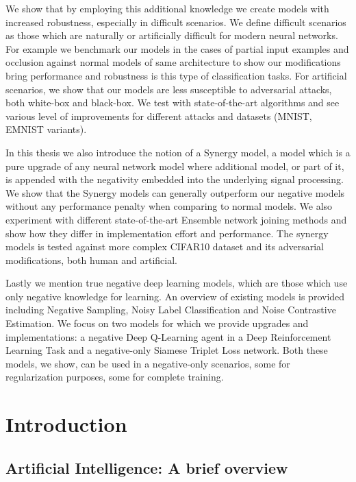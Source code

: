 \documentclass[b5paper]{book}
\begin{document}
We show that by employing this additional knowledge we create models with increased robustness, especially in difficult scenarios. We define difficult scenarios as those which are naturally or artificially difficult for modern neural networks. For example we benchmark our models in the cases of partial input examples and occlusion against normal models of same architecture to show our modifications bring performance and robustness is this type of classification tasks. For artificial scenarios, we show that our models are less susceptible to adversarial attacks, both white-box and black-box. We test with state-of-the-art algorithms and see various level of improvements for different attacks and datasets (MNIST, EMNIST variants).

In this thesis we also introduce the notion of a Synergy model, a model which is a pure upgrade of any neural network model where additional model, or part of it, is appended with the negativity embedded into the underlying signal processing. We show that the Synergy models can generally outperform our negative models without any performance penalty when comparing to normal models. We also experiment with different state-of-the-art Ensemble network joining methods and show how they differ in implementation effort and performance. The synergy models is tested against more complex CIFAR10 dataset and its adversarial modifications, both human and artificial.

Lastly we mention true negative deep learning models, which are those which use only negative knowledge for learning. An overview of existing models is provided including Negative Sampling, Noisy Label Classification and Noise Contrastive Estimation. We focus on two models for which we provide upgrades and implementations: a negative Deep Q-Learning agent in a Deep Reinforcement Learning Task and a negative-only Siamese Triplet Loss network. Both these models, we show, can be used in a negative-only scenarios, some for regularization purposes, some for complete training.

\tableofcontents

\mainmatter

\part{Introduction}
\chapter{Artificial Intelligence: A brief overview}
\end{document}

